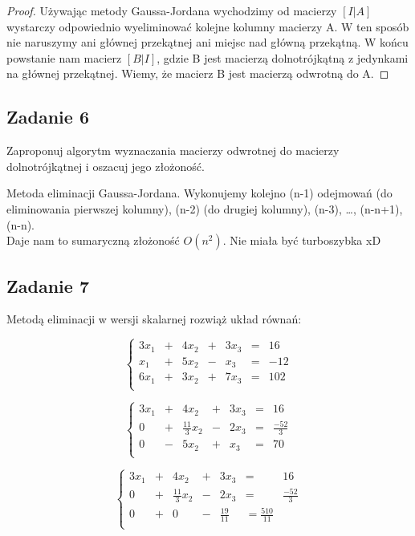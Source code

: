 \documentclass[a4paper]{article}
\begin{document}
\begin{proof}

Używając metody Gaussa-Jordana wychodzimy od macierzy $[I|A]$ wystarczy odpowiednio wyeliminować kolejne kolumny macierzy A. W ten sposób nie naruszymy ani głównej przekątnej ani miejsc nad główną przekątną. W końcu powstanie nam macierz $[B|I]$, gdzie B jest macierzą dolnotrójkątną z jedynkami na głównej przekątnej. Wiemy, że macierz B jest macierzą odwrotną do A.

\end{proof}
\subsection*{Zadanie 6}
Zaproponuj algorytm wyznaczania macierzy odwrotnej do macierzy dolnotrójkątnej i oszacuj jego złożoność.

Metoda eliminacji Gaussa-Jordana. Wykonujemy kolejno (n-1) odejmowań (do eliminowania pierwszej kolumny), (n-2) (do drugiej kolumny), (n-3), \dots , (n-n+1), (n-n).\\
Daje nam to sumaryczną złożoność $O(n^2)$. Nie miała być turboszybka xD


\clearpage
\subsection*{Zadanie 7}
Metodą eliminacji w wersji skalarnej rozwiąż układ równań:

$$\left\{ \begin{matrix}
3x_1 & + & 4x_2 & + & 3x_3 & = & 16\\
x_1 & + & 5x_2 & - & x_3 & = & -12\\
6x_1 & + & 3x_2 & + & 7x_3 & = & 102\\
\end{matrix}\right. $$

$$\left\{ \begin{matrix}
3x_1 & + & 4x_2 & + & 3x_3 & = & 16\\
0 & + & \frac{11}{3}x_2 & - & 2x_3 & = & \frac{-52}{3}\\
0 & - & 5x_2 & + & x_3 & = & 70\\
\end{matrix}\right. $$

$$\left\{ \begin{matrix}
3x_1 & + & 4x_2 & + & 3x_3 & = & 16\\
0 & + & \frac{11}{3}x_2 & - & 2x_3 & = & \frac{-52}{3}\\
0 & + & 0 & - & \frac{19}{11} & = \frac{510}{11}\\
\end{matrix}\right. $$
\end{document}
